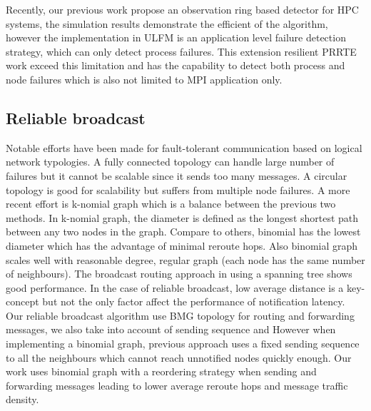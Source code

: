 \documentclass[sigconf]{acmart}
\begin{document}
Recently, our previous work \cite{George16} propose an observation ring based detector for HPC systems, the simulation results demonstrate the efficient of the algorithm, however the implementation in ULFM is an application level failure detection strategy, which can only detect process failures. This extension resilient PRRTE work exceed this limitation and has the capability to detect both process and node failures which is also not limited to MPI application only. 

\subsection{Reliable broadcast}
Notable efforts have been made for fault-tolerant communication based on logical network typologies. A fully connected topology can handle large number of failures but it cannot be scalable since it sends too many messages. A circular topology is good for scalability but suffers from multiple node failures. 
A more recent effort is k-nomial graph \cite{Angskun07, Pava11} which is a balance between the previous two methods. In k-nomial graph, the diameter is defined as the longest shortest path between any two nodes in the graph. Compare to others, binomial has the lowest diameter which has the advantage of minimal reroute hops. Also binomial graph scales well with reasonable degree, regular graph (each node has the same number of neighbours). The broadcast routing approach in \cite{Angskun07} using a spanning tree shows good performance. In the case of reliable broadcast, low average distance is a key-concept but not the only factor affect the performance of notification latency. Our reliable broadcast algorithm use BMG topology for routing and forwarding messages, we also take into account of sending sequence and 
However when implementing a binomial graph, previous approach \cite{Angskun07} uses a fixed sending sequence to all the neighbours which cannot reach unnotified nodes quickly enough. Our work uses binomial graph with a reordering strategy when sending and forwarding messages leading to lower average reroute hops and message traffic density.
 
\end{document}
